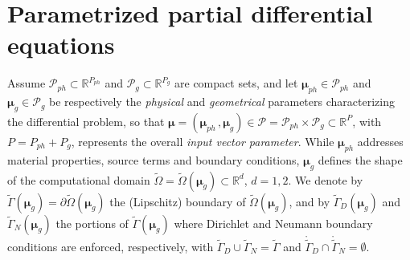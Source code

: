 \documentclass[longtitle]{elsarticle}
\numberwithin{equation}{section}
\theoremstyle{theorem}
\theoremstyle{definition}
\theoremstyle{remark}
\theoremstyle{proposition}
\numberwithin{figure}{section}
\newcommand{\wt}[1]{\widetilde{#1}}
\newcommand{\bg}[1]{\boldsymbol{#1}}
\begin{document}
		
	\section{Parametrized partial differential equations}
	\label{section:Parametrized partial differential equations}
		
		Assume $\mathcal{P}_{ph} \subset \mathbb{R}^{P_{ph}}$ and $\mathcal{P}_g \subset \mathbb{R}^{P_{g}}$ are compact sets, and let $\boldsymbol{\mu}_{ph} \in \mathcal{P}_{ph}$ and $\boldsymbol{\mu}_{g} \in \mathcal{P}_{g}$ be respectively the \emph{physical} and \emph{geometrical} parameters characterizing the differential problem, so that $\boldsymbol{\mu} = (\boldsymbol{\mu}_{ph} \, , \boldsymbol{\mu}_{g}) \in \mathcal{P} = \mathcal{P}_{ph} \times \mathcal{P}_g \subset \mathbb{R}^P$, with $P = P_{ph} + P_g$, represents the overall \emph{input vector parameter}. While $\bg{\mu}_{ph}$ addresses material properties, source terms and boundary conditions, $\bg{\mu}_g$ defines the shape of the computational domain $\wt{\Omega} = \wt{\Omega}(\boldsymbol{\mu}_g) \subset \mathbb{R}^d$, $d = 1,2$. We denote by $\wt{\Gamma}(\boldsymbol{\mu}_g) = \partial \wt{\Omega}(\boldsymbol{\mu}_g)$ the (Lipschitz) boundary of $\wt{\Omega}(\boldsymbol{\mu}_g)$, and by $\wt{\Gamma}_D(\boldsymbol{\mu}_g)$ and $\wt{\Gamma}_N(\boldsymbol{\mu}_g)$ the portions of $\wt{\Gamma}(\boldsymbol{\mu}_g)$ where Dirichlet and Neumann boundary conditions are enforced, respectively, with $\wt{\Gamma}_D \cup \wt{\Gamma}_N = \wt{\Gamma}$ and $\mathring{\wt{\Gamma}}_D \cap \mathring{\wt{\Gamma}}_N = \emptyset$.
		
\end{document}

